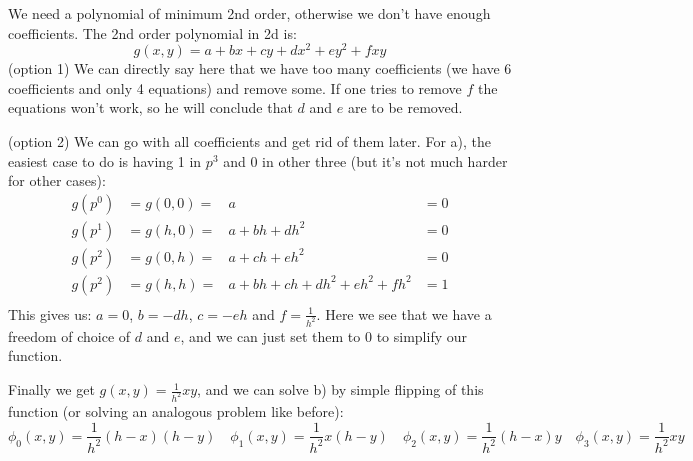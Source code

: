 \documentclass[12pt,class=article,crop=false,preview=false]{standalone}
\begin{document}
\begin{solution}
We need a polynomial of minimum 2nd order, otherwise we don't have enough coefficients. The 2nd order polynomial in 2d is:
\[g(x,y)=a+bx+cy+dx^2+ey^2+fxy\]
(option 1) We can directly say here that we have too many coefficients (we have 6 coefficients and only 4 equations) and remove some. If one tries to remove $f$ the equations won't work, so he will conclude that $d$ and $e$ are to be removed.

(option 2) We can go with all coefficients and get rid of them later. For a), the easiest case to do is having 1 in $p^3$ and 0 in other three (but it's not much harder for other cases):
\begin{align*}
    g(p^0)&=g(0,0)=&a &= 0\\
    g(p^1)&=g(h,0)=&a+bh+dh^2 &= 0\\
    g(p^2)&=g(0,h)=&a+ch+eh^2 &= 0\\
    g(p^2)&=g(h,h)=&a+bh+ch+dh^2+eh^2+fh^2 &= 1\\
\end{align*}
This gives us: $a=0$, $b = -dh$, $c = -eh$ and $f=\frac{1}{h^2}$. Here we see that we have a freedom of choice of $d$ and $e$, and we can just set them to $0$ to simplify our function.

Finally we get $g(x,y) = \frac{1}{h^2}xy$, and we can solve b) by simple flipping of this function (or solving an analogous problem like before):
\[\phi_0(x,y)=\frac{1}{h^2}(h-x)(h-y)\quad\phi_1(x,y)=\frac{1}{h^2}x(h-y)\quad\phi_2(x,y)=\frac{1}{h^2}(h-x)y\quad\phi_3(x,y)=\frac{1}{h^2}xy\]


\end{solution}
\end{document}
